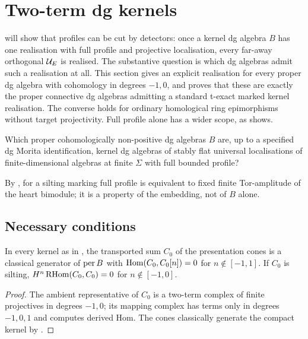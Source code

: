 \section{Two-term dg kernels}\label{sec:realisation}

 will show that profiles can be cut by detectors: once a kernel dg algebra \(B\) has one realisation with full profile and projective localisation, every far-away orthogonal \(\mathcal U_E\) is realised.  The substantive question is which dg algebras admit such a realisation at all.  This section gives an explicit realisation for every proper dg algebra with cohomology in degrees \(-1,0\), and proves that these are exactly the proper connective dg algebras admitting a standard t-exact marked kernel realisation.  The converse holds for ordinary homological ring epimorphisms without target projectivity.  Full profile alone has a wider scope, as  shows.

\begin{question}\label{q:realisation}
Which proper cohomologically non-positive dg algebras \(B\) are, up to a specified dg Morita identification, kernel dg algebras of stably flat universal localisations of finite-dimensional algebras at finite \(\Sigma\) with full bounded profile?
\end{question}

By , for a silting marking full profile is equivalent to fixed finite Tor-amplitude of the heart bimodule; it is a property of the embedding, not of \(B\) alone.

\subsection{Necessary conditions}

\begin{proposition}\label{prop:thin}
In every kernel as in , the transported sum \(C_0\) of the presentation cones is a classical generator of \(\operatorname{per} B\) with \(\operatorname{Hom}(C_0,C_0[n])=0\) for \(n\notin[-1,1]\).  If \(C_0\) is silting, \(H^n\operatorname{RHom}(C_0,C_0)=0\) for \(n\notin[-1,0]\).
\end{proposition}

\begin{proof}
The ambient representative of \(C_0\) is a two-term complex of finite projectives in degrees \(-1,0\); its mapping complex has terms only in degrees \(-1,0,1\) and computes derived Hom.  The cones classically generate the compact kernel by .
\end{proof}

